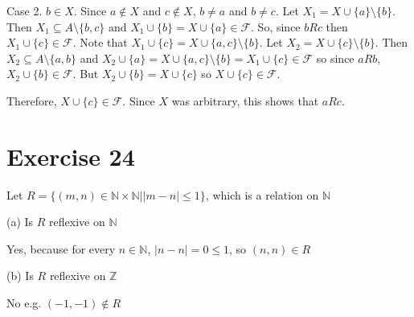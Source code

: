 \documentclass[11pt]{article}
\newcommand{\family}[1]{\mathcal{#1}}
\begin{document}
Case 2. $b \in X$. Since $a \notin X$ and $c \notin X$, $b \neq a$ and 
$b \neq c$. Let $X_1 = X \cup \{a\} \setminus \{b\}$. Then 
$X_1 \subseteq A \setminus \{b, c\}$ and 
$X_1 \cup \{b\} = X \cup \{a\} \in \family{F}$. So, since $bRc$ then 
$X_1 \cup \{c\} \in \family{F}$. Note that 
$X_1 \cup \{c\} = X \cup \{a,c\} \setminus \{b\}$. Let 
$X_2 = X \cup \{c\} \setminus \{b\}$.
Then $X_2 \subseteq A \setminus \{a, b\}$ and 
$X_2 \cup \{a\} = X \cup \{a, c\} \setminus \{b\} = X_1 \cup \{c\} \in \family{F}$
so since $aRb$, $X_2 \cup \{b\} \in \family{F}$. But $X_2 \cup \{b\} = X \cup \{c\}$
so $X \cup \{c\} \in \family{F}$.

Therefore, $X \cup \{c\} \in \family{F}$. Since $X$ was arbitrary, this shows that 
$aRc$.

\section*{Exercise 24}

Let $R = \{(m,n) \in \mathbb{N} \times \mathbb{N} | |m - n| \leq 1\}$, which 
is a relation on $\mathbb{N}$

\noindent (a) Is $R$ reflexive on $\mathbb{N}$

Yes, because for every $n \in \mathbb{N}$, $|n - n| = 0 \leq 1$, so $(n,n) \in R$

\noindent (b) Is $R$ reflexive on $\mathbb{Z}$

No e.g. $(-1, -1) \notin R$
\end{document}

